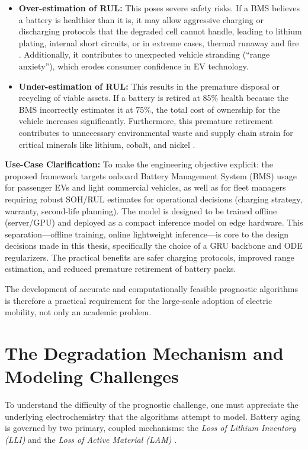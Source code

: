 \begin{itemize}
    \item \textbf{Over-estimation of RUL:} This poses severe safety risks. If a BMS believes a battery is healthier than it is, it may allow aggressive charging or discharging protocols that the degraded cell cannot handle, leading to lithium plating, internal short circuits, or in extreme cases, thermal runaway and fire \cite{ref1_general}. Additionally, it contributes to unexpected vehicle stranding (``range anxiety''), which erodes consumer confidence in EV technology.
    
    \item \textbf{Under-estimation of RUL:} This results in the premature disposal or recycling of viable assets. If a battery is retired at 85\% health because the BMS incorrectly estimates it at 75\%, the total cost of ownership for the vehicle increases significantly. Furthermore, this premature retirement contributes to unnecessary environmental waste and supply chain strain for critical minerals like lithium, cobalt, and nickel \cite{ref1_general}.
\end{itemize}

\textbf{Use-Case Clarification:} To make the engineering objective explicit: the proposed framework targets onboard Battery Management System (BMS) usage for passenger EVs and light commercial vehicles, as well as for fleet managers requiring robust SOH/RUL estimates for operational decisions (charging strategy, warranty, second-life planning). The model is designed to be trained offline (server/GPU) and deployed as a compact inference model on edge hardware. This separation—offline training, online lightweight inference—is core to the design decisions made in this thesis, specifically the choice of a GRU backbone and ODE regularizers. The practical benefits are safer charging protocols, improved range estimation, and reduced premature retirement of battery packs.

The development of accurate and computationally feasible prognostic algorithms is therefore a practical requirement for the large-scale adoption of electric mobility, not only an academic problem.

\section{The Degradation Mechanism and Modeling Challenges}

To understand the difficulty of the prognostic challenge, one must appreciate the underlying electrochemistry that the algorithms attempt to model. Battery aging is governed by two primary, coupled mechanisms: the \textit{Loss of Lithium Inventory (LLI)} and the \textit{Loss of Active Material (LAM)} \cite{ref1_general}.

